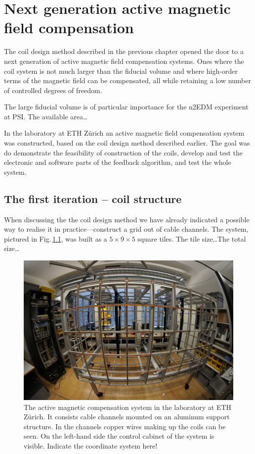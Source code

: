 \chapter{Next generation active magnetic field compensation}
\label{ch:sfc-prototype}

The coil design method described in the previous chapter opened the door to a next generation of active magnetic field compensation systems. Ones where the coil system is not much larger than the fiducial volume and where high-order terms of the magnetic field can be compensated, all while retaining a low number of controlled degrees of freedom.

The large fiducial volume is of particular importance for the n2EDM experiment at PSI. The available area\ldots

In the laboratory at ETH Zürich an active magnetic field compensation system was constructed, based on the coil design method described earlier. The goal was do demonstrate the feasibility of construction of the coils, develop and test the electronic and software parts of the feedback algorithm, and test the whole system.



\section{The first iteration -- coil structure}
When discussing the the coil design method we have already indicated a possible way to realise it in practice---construct a grid out of cable channels. The system, pictured in Fig.\,\ref{fig:prototype_photo}, was built as a $5 \times 9 \times 5$ square tiles. The tile size\ldots The total size\ldots
{}

\begin{figure}
  \centering
  \includegraphics[width=0.9\linewidth]{gfx/prototype/DSC03472.JPG}
  \caption{The active magnetic compensation system in the laboratory at ETH Zürich. It consists cable channels mounted on an aluminum support structure. In the channels copper wires making up the coils can be seen. On the left-hand side the control cabinet of the system is visible. Indicate the coordinate system here!}
  \label{fig:prototype_photo}
\end{figure}

